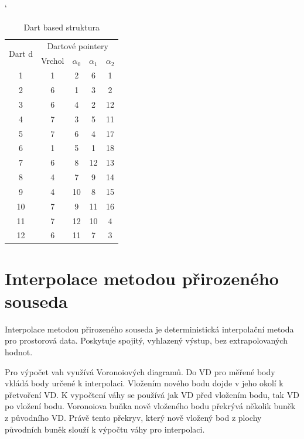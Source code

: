 \documentclass[12pt,a4paper]{article}
\begin{document}
\begin{table}[h!]
\catcode`
\begin{tabular}{|c||c|c|c|c|}
\hline
\multirow{2}{*}{Dart d} & \multicolumn{4}{c|}{Dartové pointery} \\ \cline{2-5} 
                         & Vrchol &$\alpha_0$ & $\alpha_1$ & $\alpha_2$      \\ \hline
1                        & 1          & 2      & 6      & 1      \\ \hline
2                        & 6          & 1      & 3      & 2      \\ \hline
3                        & 6          & 4      & 2      & 12     \\ \hline
4                        & 7          & 3      & 5      & 11     \\ \hline
5                        & 7          & 6      & 4      & 17     \\ \hline
6                        & 1          & 5      & 1      & 18     \\ \hline
7                        & 6          & 8      & 12     & 13     \\ \hline
8                        & 4          & 7      & 9      & 14     \\ \hline
9                        & 4          & 10     & 8      & 15     \\ \hline
10                       & 7          & 9      & 11     & 16     \\ \hline
11                       & 7          & 12     & 10     & 4      \\ \hline
12                       & 6          & 11     & 7      & 3      \\ \hline
\end{tabular}
\caption{Dart based struktura}
\label{tab:dart_based}
\end{table}

\newpage
\section{Interpolace metodou přirozeného souseda}

Interpolace metodou přirozeného souseda je deterministická interpolační metoda pro prostorová data. Poskytuje spojitý, vyhlazený výstup, bez extrapolovaných hodnot. 

Pro výpočet vah využívá Voronoiových diagramů. Do VD pro měřené body vkládá body určené k interpolaci. Vložením nového bodu dojde v jeho okolí k přetvoření VD. K vypočtení váhy se používá jak VD před vložením bodu, tak VD po vložení bodu. Voronoiova buňka nově vloženého bodu překrývá několik buněk z původního VD. Právě tento překryv, který nově vložený bod  z plochy původních buněk slouží k výpočtu váhy pro interpolaci.
\end{document}
